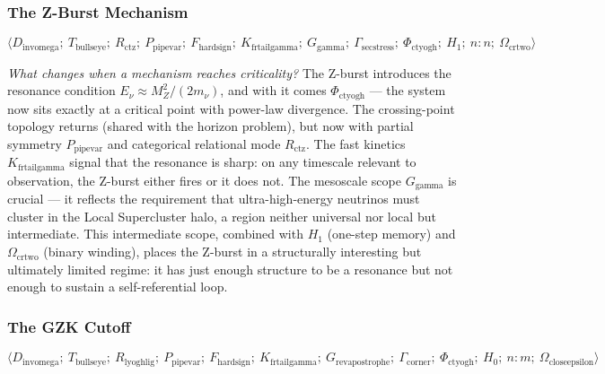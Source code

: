 \documentclass[12pt,a4paper]{article}
\begin{document}
\subsubsection{The Z-Burst Mechanism}

\[\langle D_{\text{invomega}};\ T_{\text{bullseye}};\ R_{\text{ctz}};\ P_{\text{pipevar}};\ F_{\text{hardsign}};\ K_{\text{frtailgamma}};\ G_{\text{gamma}};\ \Gamma_{\text{secstress}};\ \Phi_{\text{ctyogh}};\ H_1;\ n{:}n;\ \Omega_{\text{crtwo}} \rangle\]

\emph{What changes when a mechanism reaches criticality?} The Z-burst introduces the resonance condition $E_{\nu} \approx M_Z^2 / (2 m_{\nu})$, and with it comes $\Phi_{\text{ctyogh}}$ --- the system now sits exactly at a critical point with power-law divergence. The crossing-point topology returns (shared with the horizon problem), but now with partial symmetry $P_{\text{pipevar}}$ and categorical relational mode $R_{\text{ctz}}$. The fast kinetics $K_{\text{frtailgamma}}$ signal that the resonance is sharp: on any timescale relevant to observation, the Z-burst either fires or it does not. The mesoscale scope $G_{\text{gamma}}$ is crucial --- it reflects the requirement that ultra-high-energy neutrinos must cluster in the Local Supercluster halo, a region neither universal nor local but intermediate. This intermediate scope, combined with $H_1$ (one-step memory) and $\Omega_{\text{crtwo}}$ (binary winding), places the Z-burst in a structurally interesting but ultimately limited regime: it has just enough structure to be a resonance but not enough to sustain a self-referential loop.

\subsubsection{The GZK Cutoff}

\[\langle D_{\text{invomega}};\ T_{\text{bullseye}};\ R_{\text{lyoghlig}};\ P_{\text{pipevar}};\ F_{\text{hardsign}};\ K_{\text{frtailgamma}};\ G_{\text{revapostrophe}};\ \Gamma_{\text{corner}};\ \Phi_{\text{ctyogh}};\ H_0;\ n{:}m;\ \Omega_{\text{closeepsilon}} \rangle\]
\end{document}
